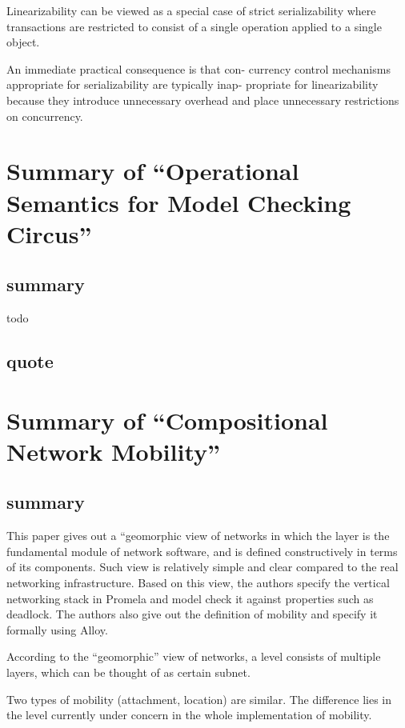 \documentclass{llncs}
\begin{document}
Linearizability can be viewed as a special case of strict serializability where
transactions are restricted to consist of a single operation applied to a single
object. 

An immediate practical consequence is that con-
currency control mechanisms appropriate for serializability are typically inap-
propriate for linearizability because they introduce unnecessary overhead and
place unnecessary restrictions on concurrency. 

\newpage

\section{Summary of ``Operational Semantics for Model Checking 
Circus''\cite{Woodcock2005Operational}} 
  \label{section:operational_circus}
\subsection{summary}
todo

\subsection{quote}

\section{Summary of ``Compositional Network Mobility''\cite{ZaveCompositional}} 
  \label{section:CNM}
\subsection{summary}
This paper gives out a ``geomorphic view of networks in which the layer is the
fundamental module of network software, and is defined constructively in terms
of its components. Such view is relatively simple and clear compared to the real
networking infrastructure. Based on this view, the authors specify the vertical
networking stack in Promela and model check it against properties such as
deadlock. The authors also give out the definition of mobility and specify it
formally using Alloy.

According to the ``geomorphic'' view of networks, a level consists of multiple
layers, which can be thought of as certain subnet.

Two types of mobility (attachment, location) are similar. The difference lies in
the level currently under concern in the whole implementation of mobility.
\end{document}

